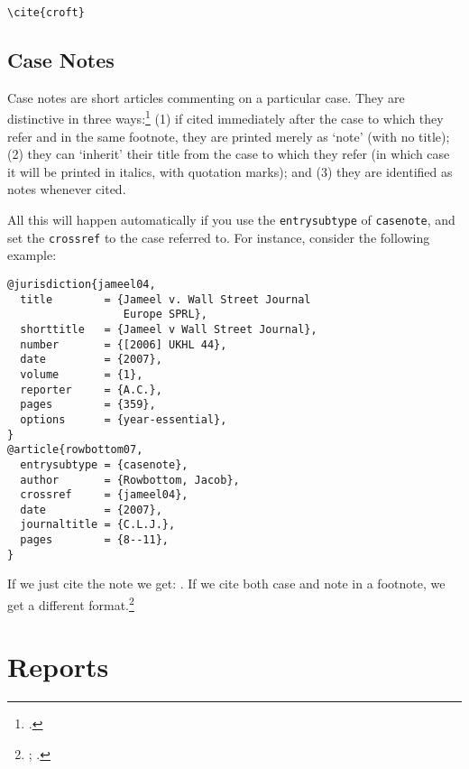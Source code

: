 \documentclass[a4paper,
               11pt,
	       DIV=1,			   
	       footinclude=false]
	      {scrartcl}
\newcounter{egcounter}\setcounter{egcounter}{0}
\newlength{\boxwidth}
\newenvironment{bibexample}[1][]
{%
  \medskip\par\noindent\ignorespaces
  \marginpar{[\refstepcounter{egcounter}\arabic{egcounter}]\label{#1}}%
  \setlength{\boxwidth}{0.95\linewidth}%
  \addtolength{\boxwidth}{-2\fboxsep}
  \addtolength{\boxwidth}{-2\fboxrule}
  \begin{lrbox}{\boxcontainer}
  \begin{minipage}[t]{\boxwidth}%
}
{%
  \end{minipage}\end{lrbox}%
  \colorbox{gray!30}{\usebox{\boxcontainer}}
  \par\medskip}
\newcommand{\egcite}[1]{{\texttt{\textbackslash cite#1}}}
\begin{document}
\begin{description}
\item[\egcite{\{croft\}}] \cite{croft}
\end{description}

\subsection{Case Notes\label{casenotes}}

Case notes are short articles commenting on a particular case. They
are distinctive in three ways:\footcite[37]{oscola} (1) if cited immediately after the case
to which they refer and in the same footnote, they are printed merely
as `note' (with no title); (2) they can `inherit' their title from the
case to which they refer (in which case it will be printed in italics, with quotation marks); and (3) they are identified as notes
whenever cited.

All this will happen automatically if you use the \texttt{entrysubtype} of \texttt{casenote}, and set the \texttt{crossref} to the case referred to.
For instance, consider the following example:

\begin{bibexample}[jameel04]
\begin{verbatim}
@jurisdiction{jameel04,
  title        = {Jameel v. Wall Street Journal
                  Europe SPRL},
  shorttitle   = {Jameel v Wall Street Journal},
  number       = {[2006] UKHL 44},
  date         = {2007},
  volume       = {1},
  reporter     = {A.C.},
  pages        = {359},
  options      = {year-essential},
}
@article{rowbottom07,
  entrysubtype = {casenote},
  author       = {Rowbottom, Jacob},
  crossref     = {jameel04},
  date         = {2007},
  journaltitle = {C.L.J.},
  pages        = {8--11},
}
\end{verbatim}
\end{bibexample}

If we just cite the note we get: \cite{rowbottom07}. If we cite both
case and note in a footnote, we get a different
format.\footnote{\cite{jameel04}; \cite[see][]{rowbottom07}.}

\section{Reports}
\end{document}
